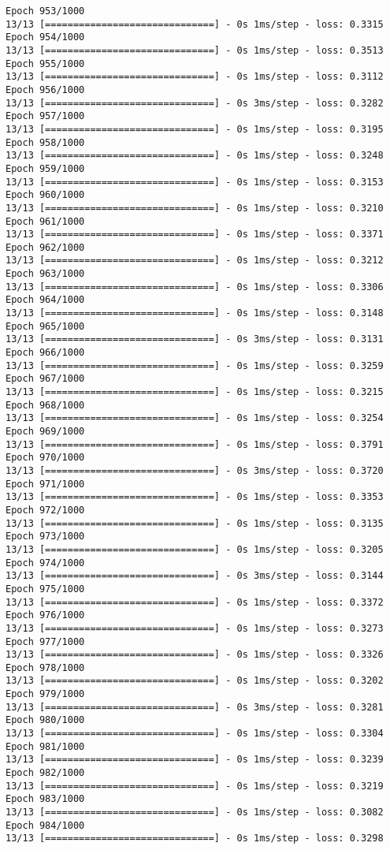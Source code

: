 \documentclass[11pt]{article}
\begin{document}
\begin{Verbatim}[commandchars=\\\{\}]
Epoch 953/1000
13/13 [==============================] - 0s 1ms/step - loss: 0.3315
Epoch 954/1000
13/13 [==============================] - 0s 1ms/step - loss: 0.3513
Epoch 955/1000
13/13 [==============================] - 0s 1ms/step - loss: 0.3112
Epoch 956/1000
13/13 [==============================] - 0s 3ms/step - loss: 0.3282
Epoch 957/1000
13/13 [==============================] - 0s 1ms/step - loss: 0.3195
Epoch 958/1000
13/13 [==============================] - 0s 1ms/step - loss: 0.3248
Epoch 959/1000
13/13 [==============================] - 0s 1ms/step - loss: 0.3153
Epoch 960/1000
13/13 [==============================] - 0s 1ms/step - loss: 0.3210
Epoch 961/1000
13/13 [==============================] - 0s 1ms/step - loss: 0.3371
Epoch 962/1000
13/13 [==============================] - 0s 1ms/step - loss: 0.3212
Epoch 963/1000
13/13 [==============================] - 0s 1ms/step - loss: 0.3306
Epoch 964/1000
13/13 [==============================] - 0s 1ms/step - loss: 0.3148
Epoch 965/1000
13/13 [==============================] - 0s 3ms/step - loss: 0.3131
Epoch 966/1000
13/13 [==============================] - 0s 1ms/step - loss: 0.3259
Epoch 967/1000
13/13 [==============================] - 0s 1ms/step - loss: 0.3215
Epoch 968/1000
13/13 [==============================] - 0s 1ms/step - loss: 0.3254
Epoch 969/1000
13/13 [==============================] - 0s 1ms/step - loss: 0.3791
Epoch 970/1000
13/13 [==============================] - 0s 3ms/step - loss: 0.3720
Epoch 971/1000
13/13 [==============================] - 0s 1ms/step - loss: 0.3353
Epoch 972/1000
13/13 [==============================] - 0s 1ms/step - loss: 0.3135
Epoch 973/1000
13/13 [==============================] - 0s 1ms/step - loss: 0.3205
Epoch 974/1000
13/13 [==============================] - 0s 3ms/step - loss: 0.3144
Epoch 975/1000
13/13 [==============================] - 0s 1ms/step - loss: 0.3372
Epoch 976/1000
13/13 [==============================] - 0s 1ms/step - loss: 0.3273
Epoch 977/1000
13/13 [==============================] - 0s 1ms/step - loss: 0.3326
Epoch 978/1000
13/13 [==============================] - 0s 1ms/step - loss: 0.3202
Epoch 979/1000
13/13 [==============================] - 0s 3ms/step - loss: 0.3281
Epoch 980/1000
13/13 [==============================] - 0s 1ms/step - loss: 0.3304
Epoch 981/1000
13/13 [==============================] - 0s 1ms/step - loss: 0.3239
Epoch 982/1000
13/13 [==============================] - 0s 1ms/step - loss: 0.3219
Epoch 983/1000
13/13 [==============================] - 0s 1ms/step - loss: 0.3082
Epoch 984/1000
13/13 [==============================] - 0s 1ms/step - loss: 0.3298

\end{Verbatim}
\end{document}
